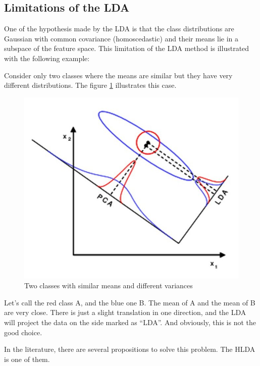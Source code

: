 \subsection{Limitations of the LDA}
\label{sec:limitations-lda}

One of the hypothesis made by the LDA is that the class distributions
are Gaussian with common covariance (homoscedastic) and their means
lie in a subspace of the feature space. This limitation of the LDA
method is illustrated with the following example:

Consider only two classes where the means are similar but they have very
different distributions. The figure \ref{fig:lda-fail} illustrates this case.

\begin{figure}[h]
  \centering
  \includegraphics[scale=0.5]{img/limitation_lda}
  \caption{Two classes with similar means and different variances}
  \label{fig:lda-fail}
\end{figure}

Let's call the red class A, and the blue one B. The mean
of A and the mean of B are very close. There is just a slight
translation in one direction, and the LDA will project the data on the
side marked as ``LDA''. And obviously, this is not the good choice.

In the literature, there are several propositions to solve this problem.
The HLDA is one of them.
